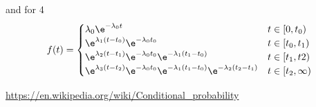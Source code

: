 \documentclass[12pt]{article}
\begin{document}
and for 4
\[ f(t) = \begin{cases}
  \lambda_0 \e^{-\lambda_0 t} & t\in[0,t_0)\\ 
  \e^{\lambda_1 (t-t_0)}\e^{-\lambda_0 t_0} & t\in[t_0,t_1)\\
  \e^{\lambda_2 (t-t_1)}\e^{-\lambda_0 t_0}\e^{-\lambda_1(t_1-t_0)} & t\in[t_1,t2)\\
  \e^{\lambda_3 (t-t_2)}\e^{-\lambda_0 t_0}\e^{-\lambda_1(t_1-t_0)}\e^{-\lambda_2(t_2-t_1)} & t\in[t_2,\infty)
\end{cases}\]



\newpage
\begin{thebibliography}{9}

  \url{https://en.wikipedia.org/wiki/Conditional_probability}

\end{thebibliography}
\end{document}
